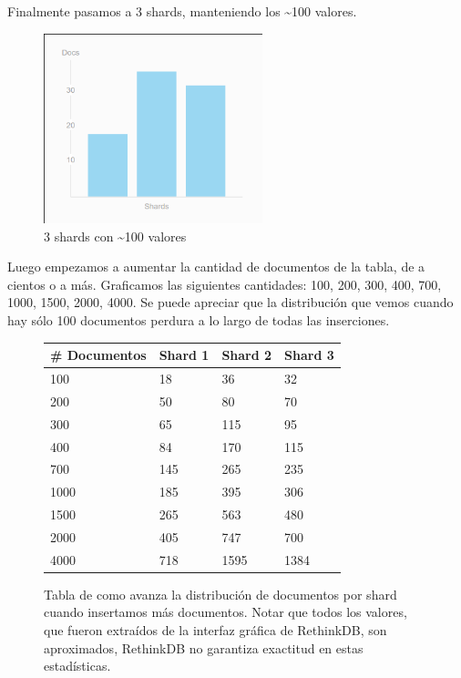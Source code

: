 Finalmente pasamos a 3 shards, manteniendo los \textasciitilde 100 valores.

\begin{figure}[H]
 \centering
 \includegraphics[width=2.5in]{sharding/img/3shard100.png}
 \caption{3 shards con \textasciitilde 100 valores}
 \label{fig:3shard100}
\end{figure}

Luego empezamos a aumentar la cantidad de documentos de la tabla, de a cientos o a más. Graficamos las siguientes cantidades: 100, 200, 300, 400, 700, 1000, 1500, 2000, 4000. Se puede apreciar que la distribución que vemos cuando hay sólo 100 documentos perdura a lo largo de todas las inserciones.

\begin{figure}[H]
\centering
\begin{tabular}{|l | l | l | l|}
  \hline
  \# Documentos & Shard 1 & Shard 2 & Shard 3 \\
  \hline
  100           & 18  & 36  & 32 \\
  200           & 50  & 80  & 70 \\
  300           & 65  & 115 & 95 \\
  400           & 84  & 170 & 115 \\
  700           & 145 & 265 & 235 \\
  1000          & 185 & 395 & 306 \\
  1500          & 265 & 563 & 480 \\
  2000          & 405 & 747 & 700 \\
  4000          & 718 & 1595 & 1384 \\
  \hline
\end{tabular}
 \caption{Tabla de como avanza la distribución de documentos por shard cuando insertamos más documentos. Notar que todos los valores, que fueron extraídos de la interfaz gráfica de RethinkDB, son aproximados, RethinkDB no garantiza exactitud en estas estadísticas.}
 \label{fig:shardstabla}
\end{figure}


